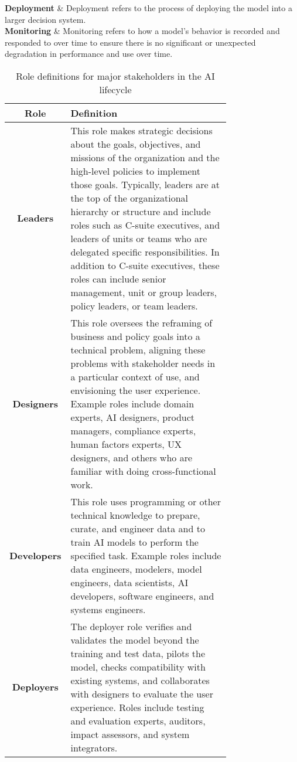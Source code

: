 \begin{table}[]
\begin{tabular}
\textbf{Deployment}         &  Deployment refers to the process of deploying the model into a larger decision system.  \\ \midrule
\textbf{Monitoring}         &  Monitoring refers to how a model’s behavior is recorded and responded to over time to ensure there is no significant or unexpected degradation in performance and use over time.  \\ \bottomrule
\end{tabular}
\label{tab:stage_table}
\end{table}

\begin{table}[]
\centering
\caption{Role definitions for major stakeholders in the AI lifecycle}
\footnotesize
\begin{tabular}
{cp{0.75\linewidth}}
\toprule
\textbf{Role}
 & \textbf{Definition} \\ \midrule
\textbf{Leaders}           &  This role makes strategic decisions about the goals, objectives, and missions of the organization and the high-level policies to implement those goals. Typically, leaders are at the top of the organizational hierarchy or structure and include roles such as C-suite executives, and leaders of units or teams who are delegated specific responsibilities. In addition to C-suite executives, these roles can include senior management, unit or group leaders, policy leaders, or team leaders.  \\ \midrule
\textbf{Designers}         &  This role oversees the reframing of business and policy goals into a technical problem, aligning these problems with stakeholder needs in a particular context of use, and envisioning the user experience. Example roles include domain experts, AI designers, product managers, compliance experts, human factors experts, UX designers, and others who are familiar with doing cross-functional work.  \\ \midrule
\textbf{Developers}        &  This role uses programming or other technical knowledge to prepare, curate, and engineer data and to train AI models to perform the specified task. Example roles include data engineers, modelers, model engineers, data scientists, AI developers, software engineers, and systems engineers.  \\ \midrule
\textbf{Deployers}         &  The deployer role verifies and validates the model beyond the training and test data, pilots the model, checks compatibility with existing systems, and collaborates with designers to evaluate the user experience. Roles include testing and evaluation experts, auditors, impact assessors, and system integrators.   \\ \midrule

\end{tabular}
\end{table}
